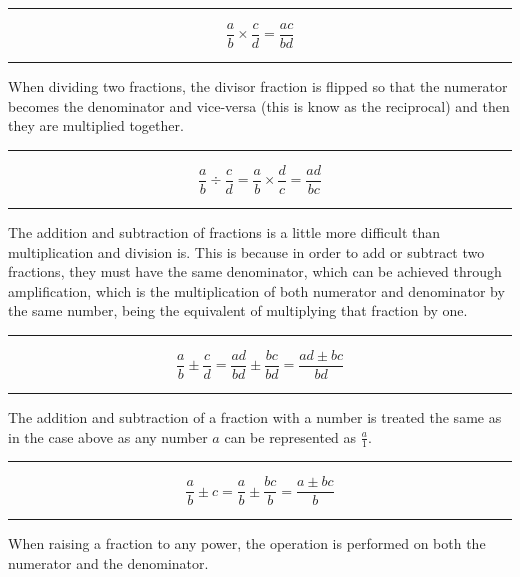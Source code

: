 \documentclass[a5paper,9pt]{book}
\theoremstyle{definition}
\newcommand{\eqlinesur}[1]{%
    \vspace*{\baselineskip}

    \hrule%

    \vspace*{\medskipamount}

    #1

    \vspace*{\medskipamount-0.5\belowdisplayskip}

    \hrule%

    \vspace*{\baselineskip}
}
\begin{document}
                \eqlinesur{%
                    \begin{equation*}
                        \frac{a}{b}\times \frac{c}{d} = \frac{ac}{bd}
                    \end{equation*}
                }

                \pagebreak

                When dividing two fractions, the divisor fraction is flipped so that the
                numerator becomes the denominator and vice-versa (this is know as the reciprocal)
                and then they are multiplied together.

                \eqlinesur{%
                    \begin{equation*}
                        \frac{a}{b}\div\frac{c}{d} = \frac{a}{b}\times\frac{d}{c} = \frac{ad}{bc}
                    \end{equation*}
                }

                The addition and subtraction of fractions is a little more difficult
                than multiplication and division is. This is because in order to add or
                subtract two fractions, they must have the same denominator, which can be
                achieved through amplification, which is the multiplication of both numerator
                and denominator by the same number, being the equivalent of multiplying
                that fraction by one.

                \eqlinesur{%
                    \begin{equation*}
                        \frac{a}{b} \pm \frac{c}{d} = \frac{ad}{bd} \pm \frac{bc}{bd} = \frac{ad \pm bc}{bd}
                    \end{equation*}
                }

                The addition and subtraction of a fraction with a number is treated the
                same as in the case above as any number $a$ can be represented as $\frac{a}{1}$.

                \eqlinesur{%
                    \begin{equation*}
                        \frac{a}{b} \pm c = \frac{a}{b} \pm \frac{bc}{b} = \frac{a\pm bc}{b}
                    \end{equation*}
                }

                When raising a fraction to any power, the operation is performed on both
                the numerator and the denominator.
\end{document}
